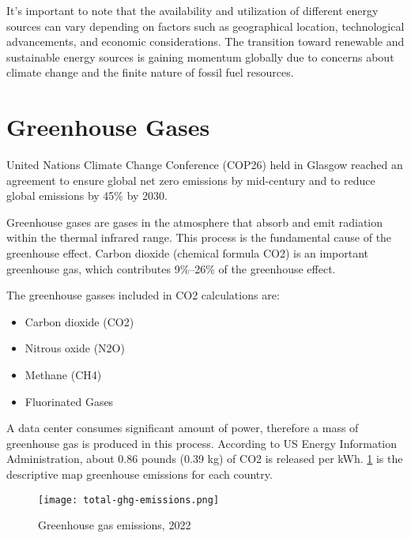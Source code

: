 \documentclass[
  a4paper,  %
  twoside,  %
  bibliography=totoc,
  headsepline,
  cleardoublepage=empty,
  parskip=half,
  draft=false
]{scrbook}
\begin{document}
It's important to note that the availability and utilization of different energy sources can vary depending on factors such as geographical location, technological advancements, and economic considerations\cite{firozjaei2020effect}\cite{kryzia2019dampening}\cite{abas2015review}. The transition toward renewable and sustainable energy sources is gaining momentum globally due to concerns about climate change and the finite nature of fossil fuel resources\cite{qazi2019towards}.

\section{Greenhouse Gases}\label{ghg_section_background}
United Nations Climate Change Conference (COP26) held in Glasgow reached an agreement to ensure global net zero emissions by mid-century and to reduce global emissions by 45\% by 2030\cite{Arora_Mishra_2021}. 


Greenhouse gases are gases in the atmosphere that absorb and emit radiation within the thermal infrared range. This process is the fundamental cause of the greenhouse effect. Carbon dioxide (chemical formula CO2) is an important greenhouse gas, which contributes 9\%–26\% of the greenhouse effect. 

The greenhouse gasses included in CO2 calculations are\cite{dioxide2017overview}:
\begin{itemize}
	\item Carbon dioxide (CO2)
	\item Nitrous oxide (N2O)
	\item Methane (CH4)
	\item Fluorinated Gases
\end{itemize}

A data center consumes significant amount of power, therefore a mass of greenhouse gas is produced in this process. According to US Energy Information Administration\cite{US2023}, about 0.86 pounds (0.39 kg) of CO2 is released per kWh. \ref{ghg_emissions} is the descriptive map greenhouse emissions for each country. 

\begin{figure}
	\centering
	\texttt{[image: total-ghg-emissions.png]}
	\caption{Greenhouse gas emissions, 2022 \cite{owid-co2-and-greenhouse-gas-emissions}}
	\label{ghg_emissions}
\end{figure}
\end{document}
